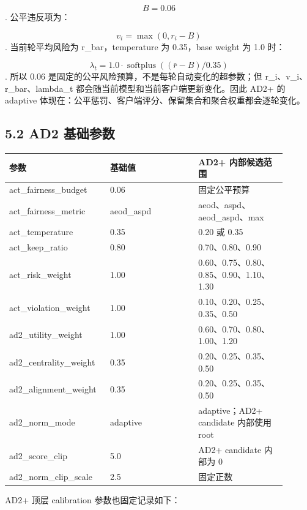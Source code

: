 \documentclass[UTF8,a4paper,10pt]{ctexart}
\begin{document}
\[B=0.06\].
公平违反项为：

\[v_i=\max(0,r_i-B)\].
当前轮平均风险为 r\_bar，temperature 为 0.35，base weight 为 1.0 时：

\[\lambda_t=1.0\cdot\operatorname{softplus}\left((\bar r-B)/0.35\right)\].
所以 0.06 是固定的公平风险预算，不是每轮自动变化的超参数；但 r\_i、v\_i、r\_bar、lambda\_t 都会随当前模型和当前客户端更新变化。因此 AD2+ 的 adaptive 体现在：公平惩罚、客户端评分、保留集合和聚合权重都会逐轮变化。

\subsection{5.2 AD2 基础参数}
{\small
\renewcommand{\arraystretch}{1.18}
\begin{longtable}{|p{0.300\linewidth}|p{0.300\linewidth}|p{0.300\linewidth}|}
\hline
参数 & 基础值 & AD2+ 内部候选范围 \\\hline
\endhead
act\_fairness\_budget & 0.06 & 固定公平预算 \\\hline
act\_fairness\_metric & aeod\_aspd & aeod、aspd、aeod\_aspd、max \\\hline
act\_temperature & 0.35 & 0.20 或 0.35 \\\hline
act\_keep\_ratio & 0.80 & 0.70、0.80、0.90 \\\hline
act\_risk\_weight & 1.00 & 0.60、0.75、0.80、0.85、0.90、1.10、1.30 \\\hline
act\_violation\_weight & 1.00 & 0.10、0.20、0.25、0.35、0.50 \\\hline
ad2\_utility\_weight & 1.00 & 0.60、0.70、0.80、1.00、1.20 \\\hline
ad2\_centrality\_weight & 0.35 & 0.20、0.25、0.35、0.50 \\\hline
ad2\_alignment\_weight & 0.35 & 0.20、0.25、0.35、0.50 \\\hline
ad2\_norm\_mode & adaptive & adaptive；AD2+ candidate 内部使用 root \\\hline
ad2\_score\_clip & 5.0 & AD2+ candidate 内部为 0 \\\hline
ad2\_norm\_clip\_scale & 2.5 & 固定正数 \\\hline
\end{longtable}
}
AD2+ 顶层 calibration 参数也固定记录如下：
\end{document}
